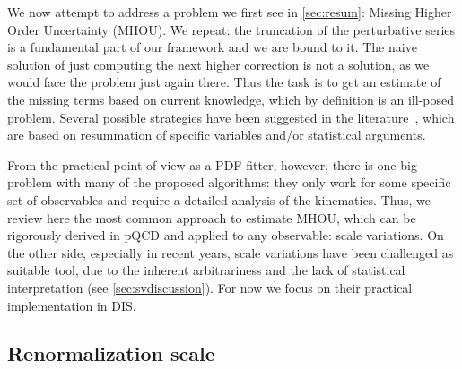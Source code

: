 We now attempt to address a problem we first see in \cref{sec:resum}: Missing Higher Order Uncertainty (MHOU).
We repeat: the truncation of the perturbative series is a fundamental part of our framework and we are bound to it.
The naive solution of just computing the next higher correction is not a solution, as we would face the problem just again there.
Thus the task is to get an estimate of the missing terms based on current knowledge, which by definition is an ill-posed problem.
Several possible strategies have been suggested in the literature~\cite{NNPDF:2024dpb,Lim:2024nsk,Tackmann:2024kci,Kassabov:2022orn,Bonvini:2020xeo,Cacciari:2011ze,Duhr:2021mfd,Ghosh:2022lrf}, which are based on resummation of specific variables and/or statistical arguments.

From the practical point of view as a PDF fitter, however, there is one big problem with many of the proposed algorithms: they only work for some specific set of observables and require a detailed analysis of the kinematics.
Thus, we review here the most common approach to estimate MHOU, which can be rigorously derived in pQCD and applied to any observable: scale variations.
On the other side, especially in recent years, scale variations have been challenged as suitable tool, due to the inherent arbitrariness and the lack of statistical interpretation (see \cref{sec:svdiscussion}).
For now we focus on their practical implementation in DIS.

\subsection{Renormalization scale}
\label{sec:rensv}

